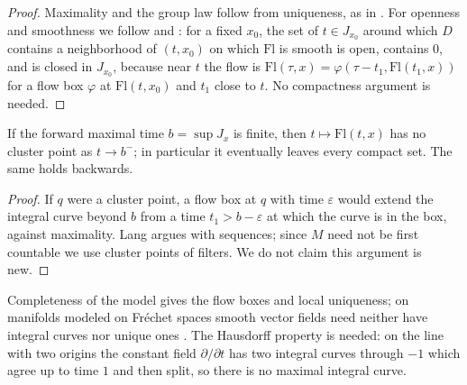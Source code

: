 \begin{proof}
  \leanok
  Maximality and the group law follow from uniqueness, as in \cite[Theorem~IV.2.2]{Lan99}. For
  openness and smoothness we follow \cite[Theorem~IV.2.6]{Lan99} and
  \cite[Theorem~2.5.18]{GN26}: for a fixed $x_0$, the set of $t \in J_{x_0}$ around which $D$
  contains a neighborhood of $(t, x_0)$ on which $\mathrm{Fl}$ is smooth is open, contains $0$,
  and is closed in $J_{x_0}$, because near $t$ the flow is
  $\mathrm{Fl}(\tau, x) = \varphi(\tau - t_1, \mathrm{Fl}(t_1, x))$ for a flow box $\varphi$ at
  $\mathrm{Fl}(t, x_0)$ and $t_1$ close to $t$. No compactness argument is needed.
\end{proof}

\begin{theorem}
  \label{thm:flow-escape}
  \leanok
  If the forward maximal time $b = \sup J_x$ is finite, then $t \mapsto \mathrm{Fl}(t, x)$ has no
  cluster point as $t \to b^-$; in particular it eventually leaves every compact set. The same
  holds backwards.
\end{theorem}

\begin{proof}
  \leanok
  If $q$ were a cluster point, a flow box at $q$ with time $\varepsilon$ would extend the integral
  curve beyond $b$ from a time $t_1 > b - \varepsilon$ at which the curve is in the box, against
  maximality. Lang argues with sequences; since $M$ need not be first countable we use cluster
  points of filters. We do not claim this argument is new.
\end{proof}

\begin{remark}[Hypotheses]
  Completeness of the model gives the flow boxes and local uniqueness; on manifolds modeled on
  Fr\'echet spaces smooth vector fields need neither have integral curves nor unique ones
  \cite[Examples~2.4.2 and 2.4.3]{GN26}. The Hausdorff property is needed: on the line with two
  origins the constant field $\partial/\partial t$ has two integral curves through $-1$ which
  agree up to time $1$ and then split, so there is no maximal integral curve.
\end{remark}

